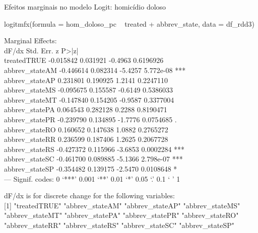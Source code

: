 \documentclass{beamer}
\begin{document}
\begin{frame}{Efeitos marginais no modelo Logit: homicídio doloso}
	\begin{tiny}
logitmfx(formula = hom_doloso_pc ~ treated + abbrev_state, data = df_rdd3)

Marginal Effects:\\
dF/dx Std. Err.       z     P>|z|    \\
treatedTRUE    -0.015842  0.031921 -0.4963 0.6196926    \\
abbrev_stateAM -0.446614  0.082314 -5.4257 5.772e-08 ***\\
abbrev_stateAP  0.231801  0.190925  1.2141 0.2247110    \\
abbrev_stateMS -0.095675  0.155587 -0.6149 0.5386033    \\
abbrev_stateMT -0.147840  0.154205 -0.9587 0.3377004    \\
abbrev_statePA  0.064543  0.282128  0.2288 0.8190471    \\
abbrev_statePR -0.239790  0.134895 -1.7776 0.0754685 .  \\
abbrev_stateRO  0.160652  0.147638  1.0882 0.2765272    \\
abbrev_stateRR  0.236599  0.187406  1.2625 0.2067728    \\
abbrev_stateRS -0.427372  0.115966 -3.6853 0.0002284 ***\\
abbrev_stateSC -0.461700  0.089885 -5.1366 2.798e-07 ***\\
abbrev_stateSP -0.354482  0.139175 -2.5470 0.0108648 *  \\
---
Signif. codes:  0 ‘***’ 0.001 ‘**’ 0.01 ‘*’ 0.05 ‘.’ 0.1 ‘ ’ 1

dF/dx is for discrete change for the following variables:\\

[1] "treatedTRUE"    "abbrev_stateAM" "abbrev_stateAP" "abbrev_stateMS"\\
[5] "abbrev_stateMT" "abbrev_statePA" "abbrev_statePR" "abbrev_stateRO"\\
[9] "abbrev_stateRR" "abbrev_stateRS" "abbrev_stateSC" "abbrev_stateSP"\\
\end{tiny}
\end{frame}
\end{document}
